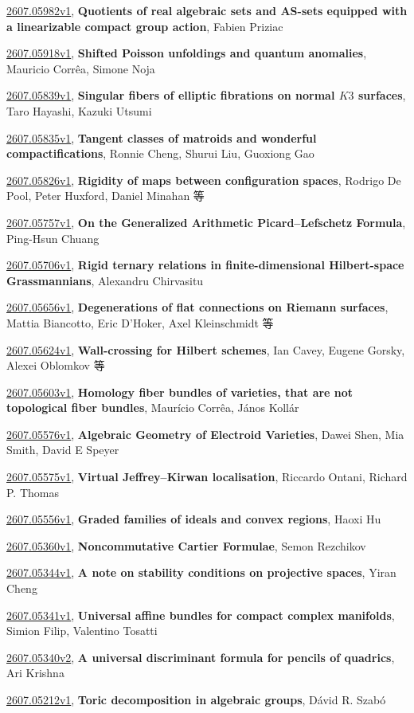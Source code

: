 \documentclass[9pt, a4paper]{article}
\theoremstyle{plain}
\theoremstyle{definition}
\theoremstyle{remark}
\newcommand{\arxiv}[3]{\href{https://arxiv.org/abs/#1}{#1}, \textbf{\textcolor{arxivblue}{#2}}, #3}
\begin{document}
\arxiv{2607.05982v1}{Quotients of real algebraic sets and AS-sets equipped with a linearizable compact group action}{Fabien Priziac}

\arxiv{2607.05918v1}{Shifted Poisson unfoldings and quantum anomalies}{Mauricio Corrêa, Simone Noja}

\arxiv{2607.05839v1}{Singular fibers of elliptic fibrations on normal $K3$ surfaces}{Taro Hayashi, Kazuki Utsumi}

\arxiv{2607.05835v1}{Tangent classes of matroids and wonderful compactifications}{Ronnie Cheng, Shurui Liu, Guoxiong Gao}

\arxiv{2607.05826v1}{Rigidity of maps between configuration spaces}{Rodrigo De Pool, Peter Huxford, Daniel Minahan 等}

\arxiv{2607.05757v1}{On the Generalized Arithmetic Picard--Lefschetz Formula}{Ping-Hsun Chuang}

\arxiv{2607.05706v1}{Rigid ternary relations in finite-dimensional Hilbert-space Grassmannians}{Alexandru Chirvasitu}

\arxiv{2607.05656v1}{Degenerations of flat connections on Riemann surfaces}{Mattia Biancotto, Eric D'Hoker, Axel Kleinschmidt 等}

\arxiv{2607.05624v1}{Wall-crossing for Hilbert schemes}{Ian Cavey, Eugene Gorsky, Alexei Oblomkov 等}

\arxiv{2607.05603v1}{Homology fiber bundles of varieties, that are not topological fiber bundles}{Maurício Corrêa, János Kollár}

\arxiv{2607.05576v1}{Algebraic Geometry of Electroid Varieties}{Dawei Shen, Mia Smith, David E Speyer}

\arxiv{2607.05575v1}{Virtual Jeffrey--Kirwan localisation}{Riccardo Ontani, Richard P. Thomas}

\arxiv{2607.05556v1}{Graded families of ideals and convex regions}{Haoxi Hu}

\arxiv{2607.05360v1}{Noncommutative Cartier Formulae}{Semon Rezchikov}

\arxiv{2607.05344v1}{A note on stability conditions on projective spaces}{Yiran Cheng}

\arxiv{2607.05341v1}{Universal affine bundles for compact complex manifolds}{Simion Filip, Valentino Tosatti}

\arxiv{2607.05340v2}{A universal discriminant formula for pencils of quadrics}{Ari Krishna}

\arxiv{2607.05212v1}{Toric decomposition in algebraic groups}{Dávid R. Szabó}
\end{document}
